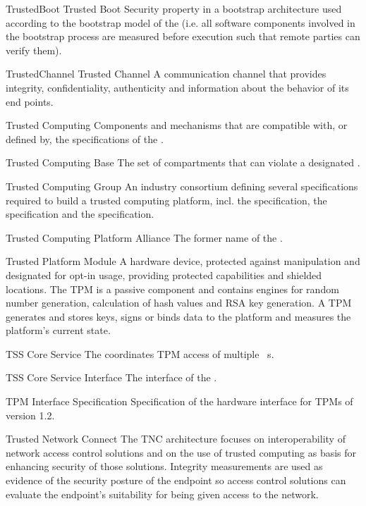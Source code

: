 \glosentry
    {TrustedBoot}
    {Trusted Boot}
    {Security property in a bootstrap architecture used according to the
bootstrap model of the \TCG (i.e. all software components involved in the
bootstrap process are measured before execution such that remote parties can
verify them).}

\glosentry
    {TrustedChannel}
    {Trusted Channel}
    {A communication channel that provides integrity, confidentiality,
authenticity and information about the behavior of its end points.}

    {Trusted Computing}
    {Components and mechanisms that are compatible with, or defined by, the
specifications of the \TCG.}

    {Trusted Computing Base}
    {The set of compartments that can violate a designated \SecurityPolicy.}

    {Trusted Computing Group}
    {An industry consortium defining several specifications required to build a trusted computing platform, incl. the \TPM specification, the \TSS specification and the \TNC specification.}

    {Trusted Computing Platform Alliance}
    {The former name of the \TCG.}

    {Trusted Platform Module}
    {A hardware device, protected against manipulation and designated for opt-in usage, providing protected capabilities and shielded locations. The TPM is a passive component and contains engines for random number generation, calculation of hash values and RSA key generation. A TPM generates and stores keys, signs or binds data to the platform and measures the platform's current state.}

    {TSS Core Service}
    {The \TCS coordinates TPM access of multiple \TSP~s.}

    {TSS Core Service Interface}
    {The interface of the \TCSlong.}

    {TPM Interface Specification}
    {Specification of the hardware interface for TPMs of version 1.2.}

    {Trusted Network Connect}
    {The TNC architecture focuses on interoperability of network access control
solutions and on the use of trusted computing as basis for enhancing
security of those solutions. Integrity measurements are used as evidence of the
security posture of the endpoint so access control solutions can evaluate the
endpoint's suitability for being given access to the network.}

